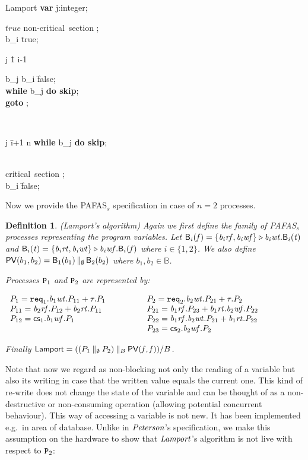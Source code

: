 \documentclass[copyright,creativecommons]{eptcs}
\newtheorem{definition}[theorem]{Definition}
\newcommand{\rop}{\triangleright}
\newcommand{\bool}{{\mathbb B}}
\newcommand{\fa}{\mathit{f}}
\newcommand{\tr}{\mathit{t}}
\newcommand{\Bv}{{\sf B}}
\newcommand{\rtb}[1]{{\it b_{{\rm #1}}rt}}
\newcommand{\rfb}[1]{{\it b_{{\rm #1}}rf}}
\newcommand{\wtb}[1]{{\it b_{{\rm #1}}wt}}
\newcommand{\wfb}[1]{{\it b_{{\rm #1}}wf}}
\newcommand{\vp}{{\sf PV}}
\newcommand{\req}{{\tt req}}
\newcommand{\cs}{{\sf cs}}
\newcommand{\peterson}{{\it Peterson}}
\newcommand{\lamport}{{\it Lamport}}
\newcommand{\lamporta}{{\sf Lamport}} \newcommand{\lamportb}{\lamporta}
\newcommand{\proc}{{\tt P}}
\begin{document}
\vspace{0.15cm}
\small
\begin{algorithm}{Lamport}{}
{\bf var} \; j:integer;\\
\begin{WHILE}{$true$}
\langle \mbox{non-critical section} \rangle; \\
b_i \= true;\\
\begin{FOR}{j \= 1 \TO i-1}
\begin{IF}{b_j}
b_i \= false; \\
{\bf while} \; b_j \; {\bf do \; skip};\\
{\bf goto} ;
\end{IF}
\end{FOR}\\
\begin{FOR}{j \= i+1 \TO n}
{\bf while} \; b_j \; {\bf do \; skip};
\end{FOR}\\
\langle \mbox{critical section} \rangle; \\
b_i \= false;
\end{WHILE}
\end{algorithm}
\normalsize
Now we provide the PAFAS$_s$ specification in case of $n=2$ processes.
\begin{definition}\label{lamp-algo1}\rm({\em Lamport's algorithm})
Again we first define the family of PAFAS$_s$ processes representing the
program variables. Let $\Bv_i(\fa) = \{\rfb{\it i}, \wfb{\it i}\}
\rop \wtb{\it i}. \Bv_i(\tr)$ and $\Bv_i(\tr) = \{\rtb{\it i}, \wtb{\it
i}\} \rop \wfb{\it i}. \Bv_i(\fa)$ where $i \in \{1,2\}$.
We also define $\vp(b_1, b_2) = \Bv_1(b_1) \,\|_{\emptyset}\,
\Bv_2(b_2)$ where $b_1, b_2 \in \bool$. 

\noindent Processes $\proc_1$ and $\proc_2$ are represented by:

$\begin{array}{l l}
P_1 = \req_1.\wtb{1}.P_{11} + \tau.P_{1} \quad\quad & \quad\quad 
P_2 = \req_2.\wtb{2}.P_{21} + \tau.P_{2} \\
P_{11} =\rfb{2}.P_{12} + \rtb{2}.P_{11} \quad \quad & \quad \quad
P_{21} = \rfb{1}.P_{23} + \rtb{1}.\wfb{2}.P_{22}\\
P_{12} = \cs_1.\wfb{1}.P_{1}\quad \quad & \quad \quad 
P_{22} = \rfb{1}.\wtb{2}.P_{21} + \rtb{1}.P_{22}\\
& \quad \quad P_{23} = \cs_2.\wfb{2}.P_{2}
\end{array}$

\noindent
Finally $\lamporta = ((P_1 \:\|_\emptyset\: P_2) \:\|_B\:
\vp(\fa,\fa))/B$. 
\end{definition}
Note that now we regard as non-blocking not only the reading of a variable
but also its writing in case that the  written value equals the current
one. This kind of re-write does not change the state of the variable and 
can be thought of as a non-destructive or non-consuming operation (allowing
potential concurrent behaviour). This way of accessing a variable is not
new. It has been implemented e.g.\ in area of database. Unlike in $\peterson$'s specification, we make this assumption on the hardware to show that $\lamport$'s algorithm is not live with respect to $\proc_2$:
\end{document}
